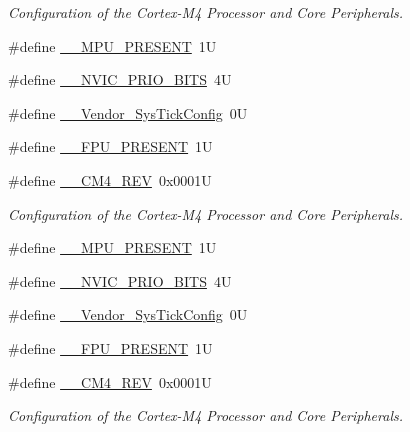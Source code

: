 \begin{DoxyCompactItemize}
\begin{DoxyCompactList}\small\item\em Configuration of the Cortex-\/\+M4 Processor and Core Peripherals. \end{DoxyCompactList}\item 
\#define \hyperlink{group___configuration__section__for___c_m_s_i_s_ga4127d1b31aaf336fab3d7329d117f448}{\+\_\+\+\_\+\+M\+P\+U\+\_\+\+P\+R\+E\+S\+E\+NT}~1U
\item 
\#define \hyperlink{group___configuration__section__for___c_m_s_i_s_gae3fe3587d5100c787e02102ce3944460}{\+\_\+\+\_\+\+N\+V\+I\+C\+\_\+\+P\+R\+I\+O\+\_\+\+B\+I\+TS}~4U
\item 
\#define \hyperlink{group___configuration__section__for___c_m_s_i_s_gab58771b4ec03f9bdddc84770f7c95c68}{\+\_\+\+\_\+\+Vendor\+\_\+\+Sys\+Tick\+Config}~0U
\item 
\#define \hyperlink{group___configuration__section__for___c_m_s_i_s_gac1ba8a48ca926bddc88be9bfd7d42641}{\+\_\+\+\_\+\+F\+P\+U\+\_\+\+P\+R\+E\+S\+E\+NT}~1U
\item 
\#define \hyperlink{group___configuration__section__for___c_m_s_i_s_ga45a97e4bb8b6ce7c334acc5f45ace3ba}{\+\_\+\+\_\+\+C\+M4\+\_\+\+R\+EV}~0x0001U
\begin{DoxyCompactList}\small\item\em Configuration of the Cortex-\/\+M4 Processor and Core Peripherals. \end{DoxyCompactList}\item 
\#define \hyperlink{group___configuration__section__for___c_m_s_i_s_ga4127d1b31aaf336fab3d7329d117f448}{\+\_\+\+\_\+\+M\+P\+U\+\_\+\+P\+R\+E\+S\+E\+NT}~1U
\item 
\#define \hyperlink{group___configuration__section__for___c_m_s_i_s_gae3fe3587d5100c787e02102ce3944460}{\+\_\+\+\_\+\+N\+V\+I\+C\+\_\+\+P\+R\+I\+O\+\_\+\+B\+I\+TS}~4U
\item 
\#define \hyperlink{group___configuration__section__for___c_m_s_i_s_gab58771b4ec03f9bdddc84770f7c95c68}{\+\_\+\+\_\+\+Vendor\+\_\+\+Sys\+Tick\+Config}~0U
\item 
\#define \hyperlink{group___configuration__section__for___c_m_s_i_s_gac1ba8a48ca926bddc88be9bfd7d42641}{\+\_\+\+\_\+\+F\+P\+U\+\_\+\+P\+R\+E\+S\+E\+NT}~1U
\item 
\#define \hyperlink{group___configuration__section__for___c_m_s_i_s_ga45a97e4bb8b6ce7c334acc5f45ace3ba}{\+\_\+\+\_\+\+C\+M4\+\_\+\+R\+EV}~0x0001U
\begin{DoxyCompactList}\small\item\em Configuration of the Cortex-\/\+M4 Processor and Core Peripherals. \end{DoxyCompactList}\item 

\end{DoxyCompactItemize}
